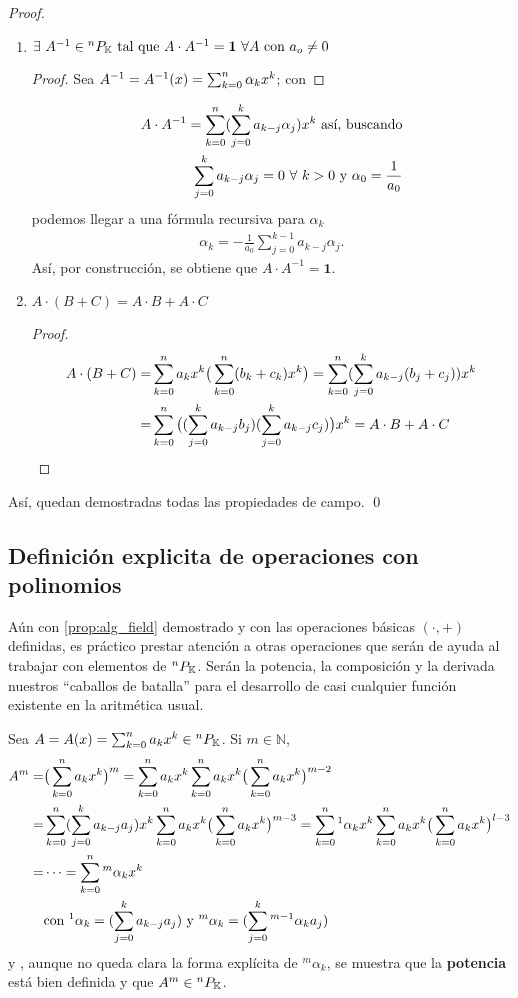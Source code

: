 \begin{proof}
\begin{enumerate}
 \item $\exists \  A^{-1} \in {^{n}P_{\mathbb{K}}} \text{ tal que } A \cdot A^{-1} = \textbf{1} \ \forall A \text{ con } a_o \neq 0 $
 \begin{proof}
 Sea $A^{-1} = A^{-1}(x) = \sum_{k=0}^n \alpha_k x^k$; con 
 \end{proof}
 \begin{align*}
  A \cdot A^{-1} = \sum_{k=0}^n  (\sum_{j=0}^k a_{k-j}\alpha_j )  x^k \text{ así, buscando} \\
  \sum_{j=0}^k a_{k-j} \alpha_j = 0 \ \forall \ k>0 \text{ y }  \alpha_0 = \frac{1}{a_0}  
 \end{align*}
 podemos llegar a una fórmula recursiva para $\alpha_k$
 \begin{align*}
 \alpha_k = -\frac{1}{a_0} \sum_{j=0}^{k-1}a_{k-j}\alpha_j.
 \end{align*}
 Así, por construcción, se obtiene que $ A \cdot A^{-1} = \textbf{1} $.
 \item $ A \cdot (B+C) = A \cdot B + A \cdot C $
 \begin{proof}
  \begin{align*}
  A \cdot (B+C) =& \sum_{k=0}^n a_k x^k \big(\sum_{k=0}^n (b_k + c_k) x^k \big) = \sum_{k=0}^n (\sum_{j=0}^k a_{k-j}(b_j+c_j) ) x^k \\
  =& \sum_{k=0}^n  \big( (\sum_{j=0}^k a_{k-j}b_j ) (\sum_{j=0}^k a_{k-j}c_j ) \big)  x^k = A \cdot B + A \cdot C
  \end{align*}   
 \end{proof}
 
\end{enumerate}
Así, quedan demostradas todas las propiedades de campo. \qed
\end{proof}

\subsection{Definición explicita de operaciones con polinomios}
\label{sec:alg_functions}

Aún con \ref{prop:alg_field} demostrado y con las operaciones básicas $(\cdot,+)$ definidas, es práctico prestar atención a otras operaciones que serán de ayuda al trabajar con elementos de ${^{n}P_{\mathbb{K}}}$. Serán la potencia, la composición y la derivada nuestros ``caballos de batalla'' para el desarrollo de casi cualquier función existente en la aritmética usual.

Sea $A = A(x) = \sum_{k=0}^n a_k x^k \in {^{n}P_{\mathbb{K}}}$. Si $m \in \mathbb{N}$,
\begin{align*}
 A^m =& \big(\sum_{k=0}^n a_k x^k\big)^m = \sum_{k=0}^n a_k x^k\sum_{k=0}^n a_k x^k\big(\sum_{k=0}^n a_k x^k\big)^{m-2} \\
 =& \sum_{k=0}^n (\sum_{j=0}^k a_{k-j}a_j ) x^k\sum_{k=0}^n a_k x^k\big(\sum_{k=0}^n a_k x^k\big)^{m-3} = \sum_{k=0}^n {^1\alpha_k} x^k\sum_{k=0}^n a_k x^k\big(\sum_{k=0}^n a_k x^k\big)^{l-3} \\
 =& \cdots = \sum_{k=0}^n {^m\alpha_k} x^k \\
 &\text{con } {^1\alpha_k} = (\sum_{j=0}^k a_{k-j}a_j ) \text{ y } {^m\alpha_k} = (\sum_{j=0}^k {^{m-1}\alpha_k}a_j ) \\
\end{align*}
y , aunque no queda clara la forma explícita de ${^m\alpha_k}$, se muestra que la \textbf{potencia} está bien definida y que $A^m \in {^{n}P_{\mathbb{K}}}$.


